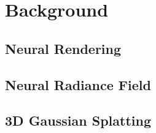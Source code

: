 \chapter{Background}
\label{chap:background}

\section{Neural Rendering}
\section{Neural Radiance Field}
\section{3D Gaussian Splatting}